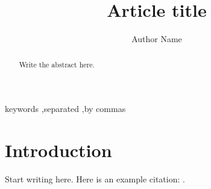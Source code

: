 \documentclass[preprint,12pt]{elsarticle}
\begin{document}
\begin{frontmatter}
\title{Article title}
\author{Author Name}

\begin{abstract}
Write the abstract here.
\end{abstract}

\begin{keyword}
keywords \sep separated \sep by commas
\end{keyword}
\end{frontmatter}

\section{Introduction}
Start writing here. Here is an example citation: \cite{lamport1994}.



\end{document}
